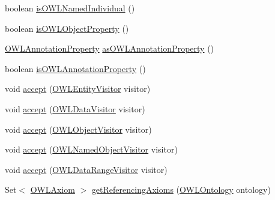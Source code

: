 \begin{DoxyCompactItemize}
\item 
boolean \hyperlink{classuk_1_1ac_1_1manchester_1_1cs_1_1owl_1_1owlapi_1_1_o_w_l_datatype_impl_ae827fec0b769159b5c71be637483e453}{is\-O\-W\-L\-Named\-Individual} ()
\item 
boolean \hyperlink{classuk_1_1ac_1_1manchester_1_1cs_1_1owl_1_1owlapi_1_1_o_w_l_datatype_impl_ac46350d16be9731bf7c79a29958100f5}{is\-O\-W\-L\-Object\-Property} ()
\item 
\hyperlink{interfaceorg_1_1semanticweb_1_1owlapi_1_1model_1_1_o_w_l_annotation_property}{O\-W\-L\-Annotation\-Property} \hyperlink{classuk_1_1ac_1_1manchester_1_1cs_1_1owl_1_1owlapi_1_1_o_w_l_datatype_impl_a858bcf66792eb2654f42118a766efa3e}{as\-O\-W\-L\-Annotation\-Property} ()
\item 
boolean \hyperlink{classuk_1_1ac_1_1manchester_1_1cs_1_1owl_1_1owlapi_1_1_o_w_l_datatype_impl_a418752242879565a4b0d5ef963d5dcab}{is\-O\-W\-L\-Annotation\-Property} ()
\item 
void \hyperlink{classuk_1_1ac_1_1manchester_1_1cs_1_1owl_1_1owlapi_1_1_o_w_l_datatype_impl_a8ef33884501be9cf45316c6c8bffed72}{accept} (\hyperlink{interfaceorg_1_1semanticweb_1_1owlapi_1_1model_1_1_o_w_l_entity_visitor}{O\-W\-L\-Entity\-Visitor} visitor)
\item 
void \hyperlink{classuk_1_1ac_1_1manchester_1_1cs_1_1owl_1_1owlapi_1_1_o_w_l_datatype_impl_acc32424180466588bf6b4eb7638d3c81}{accept} (\hyperlink{interfaceorg_1_1semanticweb_1_1owlapi_1_1model_1_1_o_w_l_data_visitor}{O\-W\-L\-Data\-Visitor} visitor)
\item 
void \hyperlink{classuk_1_1ac_1_1manchester_1_1cs_1_1owl_1_1owlapi_1_1_o_w_l_datatype_impl_a60c07b8b44af4700c8d16534a0b528d1}{accept} (\hyperlink{interfaceorg_1_1semanticweb_1_1owlapi_1_1model_1_1_o_w_l_object_visitor}{O\-W\-L\-Object\-Visitor} visitor)
\item 
void \hyperlink{classuk_1_1ac_1_1manchester_1_1cs_1_1owl_1_1owlapi_1_1_o_w_l_datatype_impl_a428c6f65d31a82a104372afdcdb4b2df}{accept} (\hyperlink{interfaceorg_1_1semanticweb_1_1owlapi_1_1model_1_1_o_w_l_named_object_visitor}{O\-W\-L\-Named\-Object\-Visitor} visitor)
\item 
void \hyperlink{classuk_1_1ac_1_1manchester_1_1cs_1_1owl_1_1owlapi_1_1_o_w_l_datatype_impl_a76cd974dbf591ec35852b8e1fe377921}{accept} (\hyperlink{interfaceorg_1_1semanticweb_1_1owlapi_1_1model_1_1_o_w_l_data_range_visitor}{O\-W\-L\-Data\-Range\-Visitor} visitor)
\item 
Set$<$ \hyperlink{interfaceorg_1_1semanticweb_1_1owlapi_1_1model_1_1_o_w_l_axiom}{O\-W\-L\-Axiom} $>$ \hyperlink{classuk_1_1ac_1_1manchester_1_1cs_1_1owl_1_1owlapi_1_1_o_w_l_datatype_impl_a535f380ddfe9c543f462dac8bb1d1d9d}{get\-Referencing\-Axioms} (\hyperlink{interfaceorg_1_1semanticweb_1_1owlapi_1_1model_1_1_o_w_l_ontology}{O\-W\-L\-Ontology} ontology)

\end{DoxyCompactItemize}
